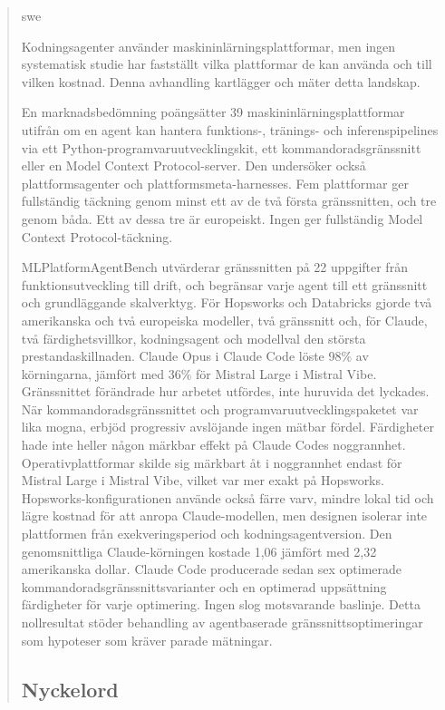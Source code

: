 \documentclass[
english,                 %
bibtex,                  %
]{kththesis}
\numberwithin{listing}{chapter}
\begin{document}
\cleardoublepage
{}
\begin{abstract}
    \markboth{\abstractname}{}
\begin{scontents}[store-env=lang]
swe
\end{scontents}

\begin{scontents}[store-env=abstracts,print-env=true]

Kodningsagenter använder maskininlärningsplattformar, men ingen systematisk studie har fastställt vilka plattformar de kan använda och till vilken kostnad. Denna avhandling kartlägger och mäter detta landskap.

En marknadsbedömning poängsätter 39 maskininlärningsplattformar utifrån om en agent kan hantera funktions-, tränings- och inferenspipelines via ett Python-programvaruutvecklingskit, ett kommandoradsgränssnitt eller en Model Context Protocol-server. Den undersöker också plattformsagenter och plattformsmeta-harnesses. Fem plattformar ger fullständig täckning genom minst ett av de två första gränssnitten, och tre genom båda. Ett av dessa tre är europeiskt. Ingen ger fullständig Model Context Protocol-täckning.

MLPlatformAgentBench utvärderar gränssnitten på 22 uppgifter från funktionsutveckling till drift, och begränsar varje agent till ett gränssnitt och grundläggande skalverktyg. För Hopsworks och Databricks gjorde två amerikanska och två europeiska modeller, två gränssnitt och, för Claude, två färdighetsvillkor, kodningsagent och modellval den största prestandaskillnaden. Claude Opus i Claude Code löste 98\% av körningarna, jämfört med 36\% för Mistral Large i Mistral Vibe. Gränssnittet förändrade hur arbetet utfördes, inte huruvida det lyckades. När kommandoradsgränssnittet och programvaruutvecklingspaketet var lika mogna, erbjöd progressiv avslöjande ingen mätbar fördel. Färdigheter hade inte heller någon märkbar effekt på Claude Codes noggrannhet. Operativplattformar skilde sig märkbart åt i noggrannhet endast för Mistral Large i Mistral Vibe, vilket var mer exakt på Hopsworks. Hopsworks-konfigurationen använde också färre varv, mindre lokal tid och lägre kostnad för att anropa Claude-modellen, men designen isolerar inte plattformen från exekveringsperiod och kodningsagentversion. Den genomsnittliga Claude-körningen kostade 1,06 jämfört med 2,32 amerikanska dollar. Claude Code producerade sedan sex optimerade kommandoradsgränssnittsvarianter och en optimerad uppsättning färdigheter för varje optimering. Ingen slog motsvarande baslinje. Detta nollresultat stöder behandling av agentbaserade gränssnittsoptimeringar som hypoteser som kräver parade mätningar.

\end{scontents}

\subsection*{Nyckelord}
\begin{scontents}[store-env=keywords,print-env=true]
\end{scontents}
\end{abstract}
\end{document}
